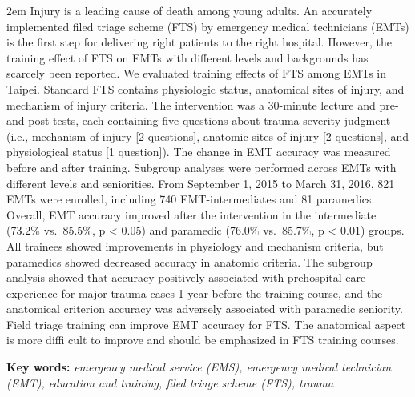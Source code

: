 \documentclass[
  20pt
]{article}
\begin{document}
\begin{minipage}{15cm}
    \vspace{5ex}

    {\parindent 2em Injury is a leading cause of death among young adults. An accurately
implemented filed triage scheme (FTS) by emergency medical technicians
(EMTs) is the first step for delivering right patients to the right
hospital. However, the training effect of FTS on EMTs with different
levels and backgrounds has scarcely been reported. We evaluated training
effects of FTS among EMTs in Taipei. Standard FTS contains physiologic
status, anatomical sites of injury, and mechanism of injury criteria.
The intervention was a 30-minute lecture and pre-and-post tests, each
containing five questions about trauma severity judgment (i.e.,
mechanism of injury {[}2 questions{]}, anatomic sites of injury {[}2
questions{]}, and physiological status {[}1 question{]}). The change in
EMT accuracy was measured before and after training. Subgroup analyses
were performed across EMTs with different levels and seniorities. From
September 1, 2015 to March 31, 2016, 821 EMTs were enrolled, including
740 EMT-intermediates and 81 paramedics. Overall, EMT accuracy improved
after the intervention in the intermediate (73.2\% vs.~85.5\%, p
\textless{} 0.05) and paramedic (76.0\% vs.~85.7\%, p \textless{} 0.01)
groups. All trainees showed improvements in physiology and mechanism
criteria, but paramedics showed decreased accuracy in anatomic criteria.
The subgroup analysis showed that accuracy positively associated with
prehospital care experience for major trauma cases 1 year before the
training course, and the anatomical criterion accuracy was adversely
associated with paramedic seniority. Field triage training can improve
EMT accuracy for FTS. The anatomical aspect is more diffi cult to
improve and should be emphasized in FTS training courses.}

    \vspace{1em}
    \textbf{Key words:} \textit{emergency medical service (EMS), emergency
medical technician (EMT), education and training, filed triage scheme
(FTS), trauma}

\end{minipage}

\vspace{2em}

\setlength{\parindent}{2em}
\end{document}

